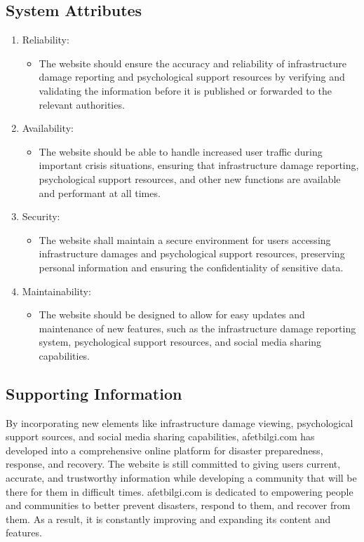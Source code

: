 \documentclass[11pt,a4paper]{article}
\begin{document}
\subsection{System Attributes}

\begin{enumerate}

\item Reliability:
\begin{itemize}
    \item The website should ensure the accuracy and reliability of infrastructure damage reporting and psychological support resources by verifying and validating the information before it is published or forwarded to the relevant authorities.
\end{itemize}

\item Availability:
\begin{itemize}
    \item The website should be able to handle increased user traffic during important crisis situations, ensuring that infrastructure damage reporting, psychological support resources, and other new functions are available and performant at all times.
\end{itemize}

\item Security:
\begin{itemize}
    \item The website shall maintain a secure environment for users accessing infrastructure damages and psychological support resources, preserving personal information and ensuring the confidentiality of sensitive data.
\end{itemize}

\item Maintainability:
\begin{itemize}
    \item The website should be designed to allow for easy updates and maintenance of new features, such as the infrastructure damage reporting system, psychological support resources, and social media sharing capabilities.
\end{itemize}

\end{enumerate}

\subsection{Supporting Information}
By incorporating new elements like infrastructure damage viewing, psychological support sources, and social media sharing capabilities, afetbilgi.com has developed into a comprehensive online platform for disaster preparedness, response, and recovery. The website is still committed to giving users current, accurate, and trustworthy information while developing a community that will be there for them in difficult times. afetbilgi.com is dedicated to empowering people and communities to better prevent disasters, respond to them, and recover from them. As a result, it is constantly improving and expanding its content and features.
\end{document}

